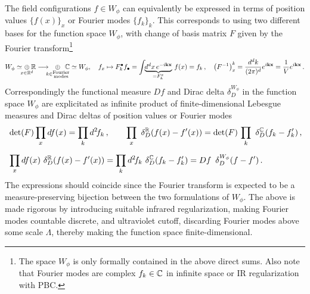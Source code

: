 \documentclass[../QFT_main.tex]{subfiles}
\begin{document}
\begin{mytheorem}
The field configurations $f\in W_\phi$ can equivalently be expressed in terms of position values $\{f(x)\}_x$ or Fourier modes $\{f_k\}_k$.
This corresponds to using two different bases for the function space $W_{\phi}$, with change of basis matrix $F$ given by the Fourier transform\footnote{The space $W_\phi$ is only formally contained in the above direct sums. Also note that Fourier modes are complex $f_k\in\mathbb{C}$ in infinite space or IR regularization with PBC.}
\begin{align}
    W_\phi \simeq\!\!\! \underset{x\in\R^d}{\oplus}\!\! \R \longrightarrow\!\!\!\! \underset{k\in\substack{\text{Fourier}\\\mathrm{modes}}}{\oplus}\!\!\!\!\C \simeq W_\phi,\quad
    f_x\mapsto F_k^\bullet f_\bullet= \int \!\!\underbrace{d^d x\, e^{-i \mathbf{k}\mathbf{x}}}_{=F_k^x}\, f(x) = f_k\,,
    \quad \big(F^{-1}\big)^k_x = \frac{d^dk}{(2\pi)^d} e^{i \mathbf{k}\mathbf{x}} = \frac{1}{V}e^{i \mathbf{k}\mathbf{x}}\,.
\end{align}
Correspondingly the functional measure $Df$ and Dirac delta $\delta_D^{W_{\phi}}$ in the function space $W_{\phi}$ are explicitated as infinite product of finite-dimensional Lebesgue measures and Dirac deltas of position values or Fourier modes
\begin{align}\label{eq:func_measure_vs_dirac_delta_change_configuration_space}
    &\det(F)\prod_x df(x) = \prod_k d^2\!f_k\,,\qquad
    \prod_x \,\,\delta_D^{\mathbb{R}}(f(x) - f'(x)) = \det(F)\, \prod_k \,\,\delta_D^{\mathbb{C}}(f_k - f'_k)\,,
    \\[6pt]
    & \prod_x df(x) \,\,\delta_D^{\mathbb{R}}(f(x) - f'(x)) = \prod_k d^2\!f_k \,\,\delta_D^{\mathbb{C}}(f_k - f'_k)
    = Df \,\,\,\delta_D^{W_{\phi}}(f - f')\,.
\end{align}
%
The expressions should coincide since the Fourier transform is expected to be a measure-preserving bijection between the two formulations of $W_{\phi}$.
The above is made rigorous by introducing suitable infrared regularization, making Fourier modes countable discrete, and ultraviolet cutoff, discarding Fourier modes above some scale $\Lambda$, thereby making the function space finite-dimensional.
%


\end{mytheorem}
\end{document}

